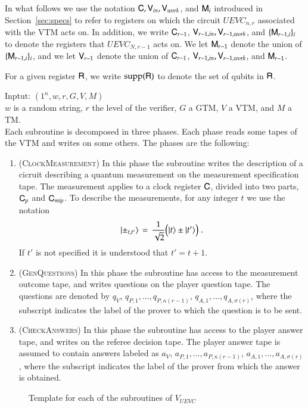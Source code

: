 In what follows we use the notation ${\mathsf{C}},{\mathsf{V}}_{in},{\mathsf{V}}_{work}$, and ${\mathsf{M}}_i$ introduced in Section~\ref{sec:specs} to refer to registers on which the circuit $UEVC_{n,r}$ associated with the VTM acts on. In addition, we write ${\mathsf{C}}_{r-1}$, ${\mathsf{V}}_{r-1,in},{\mathsf{V}}_{r-1,work}$, and $\{ {\mathsf{M}}_{r-1,i} \}_i$ to denote the registers that $UEVC_{N,r-1}$ acts on. We let ${\mathsf{M}}_{r-1}$ denote the union of $\{ {\mathsf{M}}_{r-1,i} \}_i$, and we let ${\mathsf{V}}_{r-1}$ denote the union of ${\mathsf{C}}_{r-1}$, ${\mathsf{V}}_{r-1,in},{\mathsf{V}}_{r-1,work}$, and ${\mathsf{M}}_{r-1}$. 

For a given register ${\mathsf{R}}$, we write $\operatorname{supp}({\mathsf{R}})$ to denote the set of qubits in ${\mathsf{R}}$.




\vspace{10pt}
\begin{center}
\begin{mdframed}
Inptut: $(1^n,w,r,G,V,M)$\\
  $w$ is a random string, $r$ the level of the verifier, $G$ a GTM, $V$ a VTM, and $M$ a TM.\\
Each subroutine is decomposed in three phases. Each phase reads some tapes of the VTM and writes on some others. The phases are the following: 
	\begin{enumerate}
		\item (\textsc{ClockMeasurement}) In this phase the subroutine writes the description of a cicruit describing a quantum measurement on the measurement specification tape. The measurement applies to a clock register ${\mathsf{C}}$, divided into two parts, ${\mathsf{C}}_{p}$ and ${\mathsf{C}}_{mip}$. To describe the measurements, for any integer $t$ we use the notation 
$$|\pm_{t,t'}\rangle \,=\, \frac{1}{\sqrt{2}}\big(|t\rangle\pm|t'\rangle\big)\;.$$
If $t'$ is not specified it is understood that $t'=t+1$.
	\item (\textsc{GenQuestions}) In this phase the subroutine has access to the measurement outcome tape, and writes questions on the player question tape. The questions are denoted  by $q_V$, $q_{P,1},\ldots,q_{P,\kappa(r-1)}$, $q_{A,1},\ldots,q_{A,\sigma(r)}$, where the subscript indicates the label of the prover to which the question is to be sent. 
		\item (\textsc{CheckAnswers}) In this phase the subroutine has access to the player answer tape, and writes on the referee decision tape. The player answer tape is assumed to contain answers labeled as $a_V$, $a_{P,1},\ldots,a_{P,\kappa(r-1)}$, $a_{A,1},\ldots,a_{A,\sigma(r)}$, where the subscript indicates the label of the prover from which the answer is obtained.
	\end{enumerate}    
\end{mdframed}

\end{center}
\begin{figure}[H]
\caption{Template for each of the subroutines of $V_{UEVC}$}
\label{fig:check_structure}
\end{figure}



